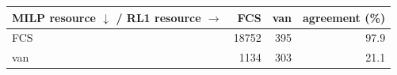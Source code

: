\begin{tabular}{@{}lrrr@{}}
\toprule
MILP resource $\downarrow$ / RL1 resource $\rightarrow$ & FCS & van & agreement (\%) \\
\midrule
FCS & 18752 & 395 & 97.9 \\
van & 1134 & 303 & 21.1 \\
\bottomrule
\end{tabular}
